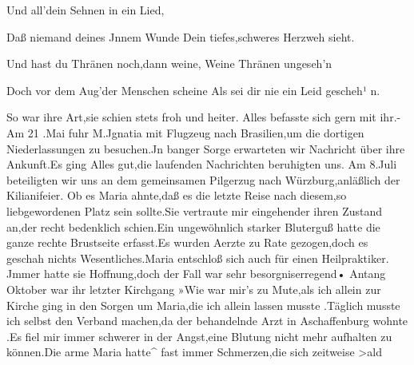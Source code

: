 \documentclass[a4paper,11pt]{article}
\begin{document}
 Und all'dein Sehnen in ein Lied,

 Daß niemand deines Jnnem Wunde Dein tiefes,schweres Herzweh sieht.

  Und hast du Thränen noch,dann weine, Weine Thränen ungeseh’n

  Doch vor dem Aug’der Menschen scheine Als sei dir nie ein Leid gescheh¹ n.

So war ihre Art,sie schien stets froh und heiter. Alles befasste sich gern mit ihr.-Am 21 .Mai fuhr M.Jgnatia mit Flugzeug nach Brasilien,um die dortigen Niederlassungen zu besuchen.Jn banger Sorge erwarteten wir Nachricht über ihre Ankunft.Es ging Alles gut,die laufenden Nachrichten beruhigten uns. Am 8.Juli beteiligten wir uns an dem gemeinsamen Pilgerzug nach Würzburg,anläßlich der Kilianifeier. Ob es Maria ahnte,daß es die letzte Reise nach diesem,so liebgewordenen Platz sein sollte.Sie vertraute mir eingehender ihren Zustand an,der recht bedenklich schien.Ein ungewöhnlich starker Bluterguß hatte die ganze rechte Brustseite erfasst.Es wurden Aerzte zu Rate gezogen,doch es geschah nichts Wesentliches.Maria entschloß sich auch für einen Heilpraktiker. Jmmer hatte sie Hoffnung,doch der Fall war sehr besorgniserregend• Antang Oktober war ihr letzter Kirchgang »Wie war mir’s zu Mute,als ich allein zur Kirche ging in den Sorgen um Maria,die ich allein lassen musste .Täglich musste ich selbst den Verband machen,da der behandelnde Arzt in Aschaffenburg wohnte .Es fiel mir immer schwerer in der Angst,eine Blutung nicht mehr aufhalten zu können.Die arme Maria hatte^ fast immer Schmerzen,die sich zeitweise >ald
\end{document}
